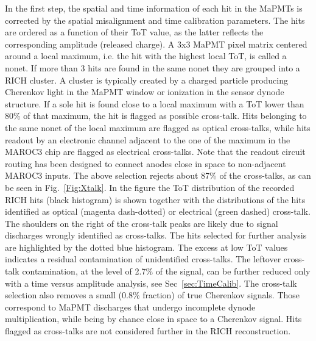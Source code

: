 \documentclass[5p,times,twocolumn]{elsarticle}
\def\MaPMT{MaPMT }
\def\MaPMTs{MaPMTs }
\def\MAROC{MAROC3 }
\begin{document}
In the first step, the spatial and time information of each hit in the \MaPMTs is corrected by the spatial misalignment and time calibration parameters. The hits are ordered as a function of their ToT value, as the latter reflects the corresponding amplitude (released charge). A 3x3 \MaPMT pixel matrix centered around a local maximum, i.e. the hit with the highest local ToT, is called a nonet. If more than 3 hits are found in the same nonet they are grouped into a RICH cluster. A cluster is typically created by a charged particle producing Cherenkov light in the \MaPMT window or ionization in the sensor dynode structure. 
If a sole hit is found close to a local maximum with a ToT lower than 80\% of that maximum, the hit is flagged as possible cross-talk. Hits belonging to the same nonet of the local maximum are flagged as optical cross-talks, while hits readout by an electronic channel adjacent to the one of the maximum in the \MAROC chip are flagged as electrical cross-talks. Note that the readout circuit routing has been designed to connect anodes close in space to non-adjacent MAROC3 inputs. The above selection rejects about 87\% of the cross-talks, as can be seen in Fig.~\ref{Fig:Xtalk}. In the figure the ToT distribution of the recorded RICH hits (black histogram) is shown together with the distributions of the hits identified as optical (magenta dash-dotted) or electrical (green dashed) cross-talk. The shoulders on the right of the cross-talk peaks are likely due to signal discharges wrongly identified as cross-talks. The hits selected for further analysis are highlighted by the dotted blue histogram. The excess at low ToT values indicates a residual contamination of unidentified cross-talks. The leftover cross-talk contamination, at the level of 2.7\% of the signal, can be further reduced only with a time versus amplitude analysis, see Sec~\ref{sec:TimeCalib}. The cross-talk selection also removes a small (0.8\% fraction) of true Cherenkov signals. Those correspond to \MaPMT discharges that undergo incomplete dynode multiplication, while being by chance close in space to a Cherenkov signal. Hits flagged as cross-talks are not considered further in the RICH reconstruction.
\end{document}
